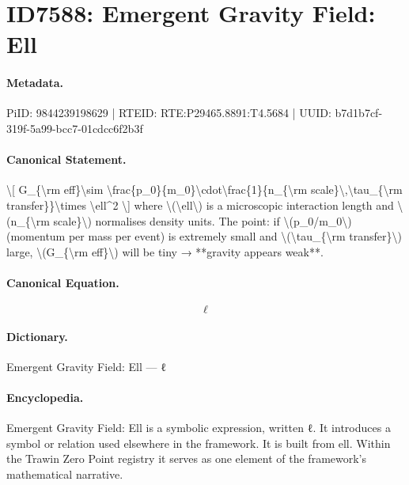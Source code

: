 \section*{ID7588: Emergent Gravity Field: Ell}
\paragraph{Metadata.}
PiID: 9844239198629 | RTEID: RTE:P29465.8891:T4.5684 | UUID: b7d1b7cf-319f-5a99-bcc7-01cdcc6f2b3f

\paragraph{Canonical Statement.}
\textbackslash{}[ G\_\{\textbackslash{}rm eff\}\textbackslash{}sim \textbackslash{}frac\{p\_0\}\{m\_0\}\textbackslash{}cdot\textbackslash{}frac\{1\}\{n\_\{\textbackslash{}rm scale\}\textbackslash{},\textbackslash{}tau\_\{\textbackslash{}rm transfer\}\}\textbackslash{}times \textbackslash{}ell\textasciicircum{}2 \textbackslash{}] where \textbackslash{}(\textbackslash{}ell\textbackslash{}) is a microscopic interaction length and \textbackslash{}(n\_\{\textbackslash{}rm scale\}\textbackslash{}) normalises density units. The point: if \textbackslash{}(p\_0/m\_0\textbackslash{}) (momentum per mass per event) is extremely small and \textbackslash{}(\textbackslash{}tau\_\{\textbackslash{}rm transfer\}\textbackslash{}) large, \textbackslash{}(G\_\{\textbackslash{}rm eff\}\textbackslash{}) will be tiny → **gravity appears weak**.

\paragraph{Canonical Equation.}
\[
\ell
\]

\paragraph{Dictionary.}
Emergent Gravity Field: Ell — ℓ

\paragraph{Encyclopedia.}
Emergent Gravity Field: Ell is a symbolic expression, written ℓ. It introduces a symbol or relation used elsewhere in the framework. It is built from ell. Within the Trawin Zero Point registry it serves as one element of the framework's mathematical narrative.
